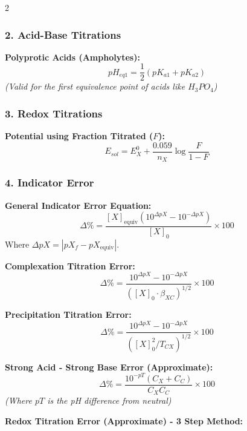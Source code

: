 \begin{multicols}{2}
\subsubsection*{2. Acid-Base Titrations}

\textbf{Polyprotic Acids (Ampholytes):}
\begin{equation}
pH_{eq1} = \frac{1}{2}(pK_{a1} + pK_{a2})
\end{equation}
\textit{(Valid for the first equivalence point of acids like $H_3PO_4$)}

\subsubsection*{3. Redox Titrations}
\textbf{Potential using Fraction Titrated ($F$):}
\begin{equation}
E_{sol} = E^0_X + \frac{0.059}{n_X} \log \frac{F}{1-F}
\end{equation}

\subsubsection*{4. Indicator Error}

\textbf{General Indicator Error Equation:}
\begin{equation}
\Delta\% = \frac{[X]_{\text{equiv}}(10^{\Delta pX} - 10^{-\Delta pX})}{[X]_0} \times 100
\end{equation}
Where \(\Delta pX = |pX_f - pX_{\text{equiv}}|\).

\textbf{Complexation Titration Error:}
\begin{equation}
\Delta\% = \frac{10^{\Delta pX} - 10^{-\Delta pX}}{([X]_0 \cdot \beta_{XC})^{1/2}} \times 100
\end{equation}

\textbf{Precipitation Titration Error:}
\begin{equation}
\Delta\% = \frac{10^{\Delta pX} - 10^{-\Delta pX}}{([X]_0^2 / T_{CX})^{1/2}} \times 100
\end{equation}

\textbf{Strong Acid - Strong Base Error (Approximate):}
\begin{equation}
\Delta\% = \frac{10^{-pT}(C_X + C_C)}{C_X C_C} \times 100
\end{equation}
\textit{(Where $pT$ is the pH difference from neutral)}

\textbf{Redox Titration Error (Approximate) - 3 Step Method:}


\end{multicols}
